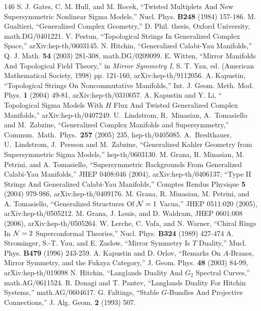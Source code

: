 \begin{thebibliography}{146}
 S. J. Gates, C. M. Hull, and M. Rocek, ``Twisted Multiplets And New Supersymmetric Nonlinear Sigma Models,'' Nucl. Phys. \textbf{B248} (1984) 157-186.
 M. Gualtieri, ``Generalized Complex Geometry,'' D. Phil. thesis, Oxford University, math.DG/0401221.
 V. Pestun, ``Topological Strings In Generalized Complex Space,'' arXiv:hep-th/0603145.
 N. Hitchin, ``Generalized Calabi-Yau Manifolds,'' Q. J. Math. \textbf{54} (2003) 281-308, math.DG/0209099.
 E. Witten, ``Mirror Manifolds And Topological Field Theory,'' in \emph{Mirror Symmetry I}, S. T. Yau, ed. (American Mathematical Society, 1998) pp. 121-160, arXiv:hep-th/9112056.
 A. Kapustin, ``Topological Strings On Noncommutative Manifolds,'' Int. J. Geom. Meth. Mod. Phys. \textbf{1} (2004) 49-81, arXiv:hep-th/0310057.
 A. Kapustin and Y. Li, `` Topological Sigma Models With $H$ Flux And Twisted Generalized Complex Manifolds,'' arXiv:hep-th/0407249.
 U.~Lindstrom, R.~Minasian, A.~Tomasiello and M.~Zabzine, ``Generalized Complex Manifolds and Supersymmetry,'' Commun.\ Math.\ Phys.\ \textbf{257} (2005) 235, hep-th/0405085.
 A.~Bredthauer, U.~Lindstrom, J.~Persson and M.~Zabzine, ``Generalized Kahler Geometry from Supersymmetric Sigma Models,'' hep-th/0603130.
 M. Grana, R. Minasian, M. Petrini, and A. Tomasiello, ``Supersymmetric Backgrounds From Generalized Calabi-Yau Manifolds,'' JHEP 0408:046 (2004), arXiv:hep-th/0406137; ``Type II Strings And Generalized Calabi-Yau Manifolds,'' Comptes Rendus Physique \textbf{5} (2004) 979-986, arXiv:hep-th/0409176.
 M. Grana, R. Minasian, M. Petrini, and A. Tomasiello, ``Generalized Structures Of ${{\mathcal{N}}}=1$ Vacua,'' JHEP 0511:020 (2005), arXiv:hep-th/0505212.
 M. Grana, J. Louis, and D. Waldram, JHEP 0601:008 (2006), arXiv:hep-th/0505264.
 W. Lerche, C. Vafa, and N. Warner, ``Chiral Rings In ${{\mathcal{N}}}=2$ Superconformal Theories,'' Nucl. Phys. \textbf{B324} (1989) 427-474
 A. Strominger, S.-T. Yau, and E. Zaslow, ``Mirror Symmetry Is $T$ Duality,'' Mucl. Phys. \textbf{B479} (1996) 243-259.
 A. Kapustin and D. Orlov, ``Remarks On $A$-Branes, Mirror Symmetry, and the Fukaya Category,'' J. Geom. Phys. \textbf{48} (2003) 84-99, arXiv:hep-th/019098
 N. Hitchin, ``Langlands Duality And $G_2$ Spectral Curves,'' math.AG/0611524.
 R. Donagi and T. Pantev, ``Langlands Duality For Hitchin Systems,'' math.AG/0604617.
 G. Faltings, ``Stable $G$-Bundles And Projective Connections,'' J. Alg. Geom. \textbf{2} (1993) 507.

\end{thebibliography}
